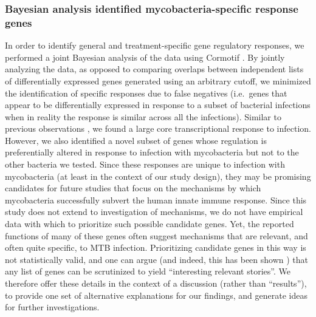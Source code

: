 \subsubsection{Bayesian analysis identified mycobacteria-specific
response
genes}\label{bayesian-analysis-identified-mycobacteria-specific-response-genes}

In order to identify general and treatment-specific gene regulatory
responses, we performed a joint Bayesian analysis of the data using
Cormotif \citep{Wei2015}. By jointly analyzing the data, as opposed to
comparing overlaps between independent lists of differentially expressed
genes generated using an arbitrary cutoff, we minimized the
identification of specific responses due to false negatives (i.e.~genes
that appear to be differentially expressed in response to a subset of
bacterial infections when in reality the response is similar across all
the infections). Similar to previous observations \citep{Huang2001,
Boldrick2002}, we found a large core transcriptional response to
infection. However, we also identified a novel subset of genes whose
regulation is preferentially altered in response to infection with
mycobacteria but not to the other bacteria we tested. Since these
responses are unique to infection with mycobacteria (at least in the
context of our study design), they may be promising candidates for
future studies that focus on the mechanisms by which mycobacteria
successfully subvert the human innate immune response. Since this study
does not extend to investigation of mechanisms, we do not have empirical
data with which to prioritize such possible candidate genes. Yet, the
reported functions of many of these genes often suggest mechanisms that
are relevant, and often quite specific, to MTB infection. Prioritizing
candidate genes in this way is not statistically valid, and one can
argue (and indeed, this has been shown \citep{Pavlidis2012}) that any
list of genes can be scrutinized to yield ``interesting relevant
stories''. We therefore offer these details in the context of a
discussion (rather than ``results''), to provide one set of alternative
explanations for our findings, and generate ideas for further
investigations.

